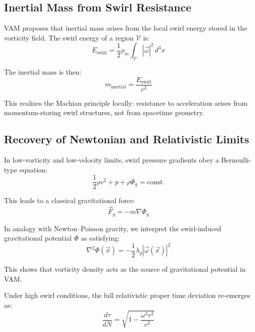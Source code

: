 \documentclass[preprint]{revtex4-2}
\begin{document}
    \subsection{Inertial Mass from Swirl Resistance}
    VAM proposes that inertial mass arises from the local swirl energy stored in the vorticity field. The swirl energy of a region $\mathcal{V}$ is:
    \begin{equation}
        E_{\text{swirl}} = \frac{1}{2} \rho_{\scriptscriptstyle\boldsymbol\!m} \int_{\mathcal{V}} |\vec{\omega}|^2 \, d^3x
        \label{eq:swirl_energy}
    \end{equation}

    The inertial mass is then:
    \begin{equation}
        m_{\text{inertial}} = \frac{E_{\text{swirl}}}{c^2}
        \label{eq:inertial_mass}
    \end{equation}

    This realizes the Machian principle locally: resistance to acceleration arises from momentum-storing swirl structures, not from spacetime geometry.

    \subsection{Recovery of Newtonian and Relativistic Limits}
    In low-vorticity and low-velocity limits, swirl pressure gradients obey a Bernoulli-type equation:
    \begin{equation}
        \frac{1}{2} \rho v^2 + p + \rho \Phi_g = \text{const.}
        \label{eq:bernoulli_grav}
    \end{equation}

    This leads to a classical gravitational force:
    \begin{equation}
        \vec{F}_g = -m \nabla \Phi_g
        \label{eq:newtonian_grav_force}
    \end{equation}

    In analogy with Newton–Poisson gravity, we interpret the swirl-induced gravitational potential \( \Phi \) as satisfying:
    \begin{equation}
        \nabla^2 \Phi(\vec{x}) = - \frac{1}{2} \lambda_g |\vec{\omega}(\vec{x})|^2
        \label{eq:swirl_poisson}
    \end{equation}

    This shows that vorticity density acts as the source of gravitational potential in VAM.

    Under high swirl conditions, the full relativistic proper time deviation re-emerges as:
    \begin{equation}
        \frac{d\tau}{dN} = \sqrt{1 - \frac{\omega^2 r^2}{c^2}}
        \label{eq:general_swirl_time}
    \end{equation}
\end{document}
